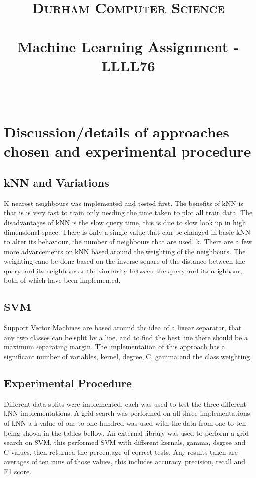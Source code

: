\documentclass[paper=a4, fontsize=11pt]{scrartcl}
\date{}
\title{
		\vspace{-0.5in} 	
		\usefont{OT1}{bch}{b}{n}
		\normalfont \normalsize \textsc{Durham Computer Science} \\ [5pt]
		\horrule{0.5pt} \\[0.4cm]
		\huge Machine Learning Assignment - LLLL76\\
		\horrule{2pt} \\[0.5cm]
		\vspace{-1in} 	
}
\numberwithin{equation}{section}		%
\numberwithin{figure}{section}			%
\numberwithin{table}{section}				%
\begin{document}
\maketitle
\section{Discussion/details of approaches chosen and experimental procedure}

\subsection{kNN and Variations}

K nearest neighbours was implemented and tested first. The benefits of kNN is that is is very fast to train only needing the time taken to plot all train data. The disadvantages of kNN is the slow query time, this is due to slow look up in high dimensional space. There is only a single value that can be changed in basic kNN to alter its behaviour, the number of neighbours that are used, k. There are a few more advancements on kNN based around the weighting of the neighbours. The weighting cane be done based on the inverse square of the distance between the query and its neighbour or the similarity between the query and its neighbour, both of which have been implemented.

\subsection{SVM}

Support Vector Machines are based around the idea of a linear separator, that any two classes can be split by a line, and to find the best line there should be a maximum separating margin. The implementation of this approach has a significant number of variables, kernel, degree, C, gamma and the class weighting.

\subsection{Experimental Procedure}

Different data splits were implemented, each was used to test the three different kNN implementations. A grid search was performed on all three implementations of kNN a k value of one to one hundred was used with the data from one to ten being shown in the tables bellow. An external library was used to perform a grid search on SVM, this performed SVM with different kernals, gamma, degree and C values, then returned the percentage of correct tests. Any results taken are averages of ten runs of those values, this includes accuracy, precision, recall and F1 score.
\end{document}
